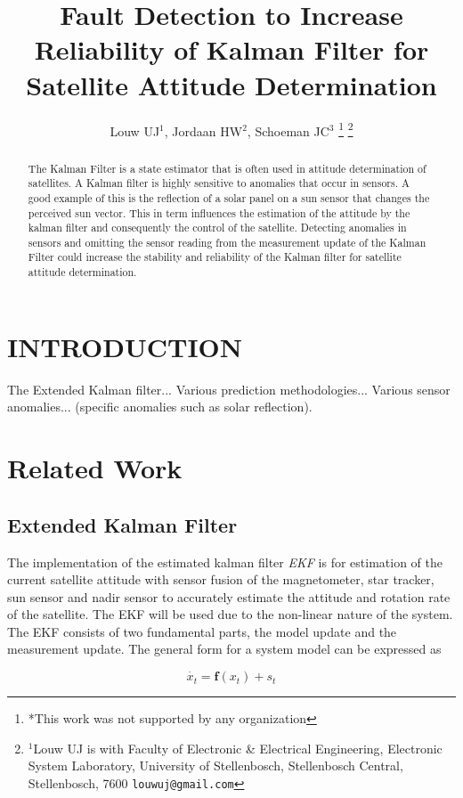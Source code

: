\documentclass[letterpaper, 10 pt, conference]{ieeeconf}  %
\title{\LARGE \bf
Fault Detection to Increase Reliability of Kalman Filter for Satellite Attitude Determination
}
\author{Louw UJ$^{1}$, Jordaan HW$^{2}$, Schoeman JC$^{3}$%
\thanks{*This work was not supported by any organization}%
\thanks{$^{1}$Louw UJ is with Faculty of Electronic \& Electrical Engineering, Electronic System            Laboratory, University of Stellenbosch, Stellenbosch Central, Stellenbosch, 7600
        {\tt\small louwuj@gmail.com}}%
}
\begin{document}
\maketitle
\thispagestyle{empty}
\pagestyle{empty}


\begin{abstract}

The Kalman Filter is a state estimator that is often used in attitude determination of satellites. A Kalman filter is highly sensitive to anomalies that occur in sensors. A good example of this is the reflection of a solar panel on a sun sensor that changes the perceived sun vector. This in term influences the estimation of the attitude by the kalman filter and consequently the control of the satellite. Detecting anomalies in sensors and omitting the sensor reading from the measurement update of the Kalman Filter could increase the stability and reliability of the Kalman filter for satellite attitude determination.

\end{abstract}


\section{INTRODUCTION}
The Extended Kalman filter... Various prediction methodologies... Various sensor anomalies... (specific anomalies such as solar reflection).

\section{Related Work}


\subsection{Extended Kalman Filter}
The implementation of the estimated kalman filter \emph{EKF} is for estimation of the current satellite attitude with sensor fusion of the magnetometer, star tracker, sun sensor and nadir sensor to accurately estimate the attitude and rotation rate of the satellite. The EKF will be used due to the non-linear nature of the system. The EKF consists of two fundamental parts, the model update and the measurement update. The general form for a system model can be expressed as

\begin{equation}
	\dot{x_t} = \mathbf{f}(x_t) + s_t
\end{equation}
\end{document}
